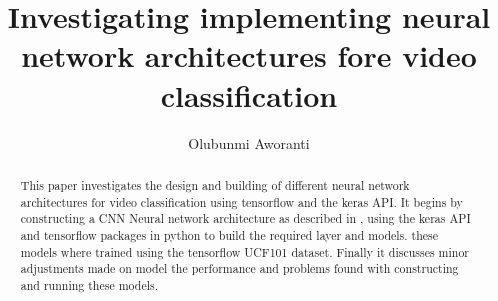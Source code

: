 \documentclass[10pt,phd,a4paper,oneside]{article}
\title{Investigating implementing neural network architectures fore video classification}
\author{Olubunmi Aworanti}
\date{}
\begin{document}
    \begin{abstract}
        This paper investigates the design and building of different neural network architectures for video classification using tensorflow and the keras API. It begins by constructing a CNN Neural network architecture as described in \citep{KarpathyCVPR14}, using the keras API and tensorflow packages in python to build the required layer and models. these models where trained using the tensorflow UCF101 dataset. Finally it discusses minor adjustments made on model the performance and problems found with constructing and running these models.
    \end{abstract}

    \maketitle
\end{document}
